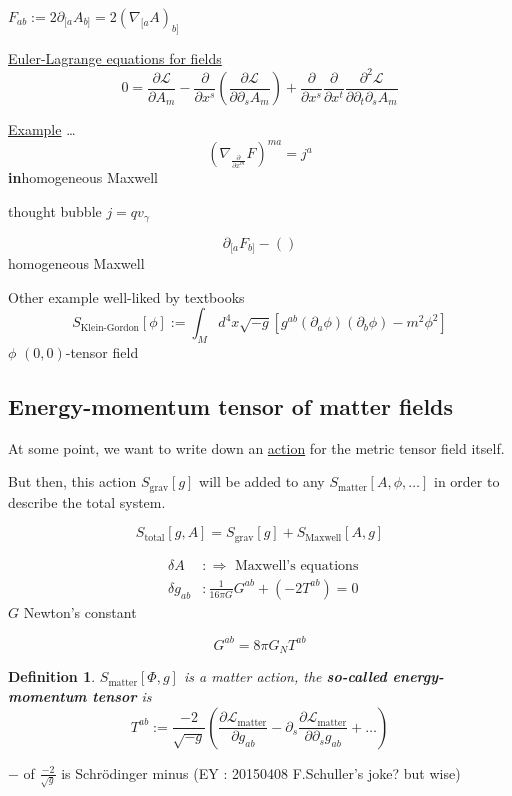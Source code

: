 \documentclass[10pt]{amsart}
\newtheorem{definition}{Definition}
\begin{document}
\begin{multicols*}{2}
	$F_{ab} := 2\partial_{[a}A_{b]} = 2(\nabla_{[a} A)_{b]}$
	
	\underline{Euler-Lagrange equations for fields}
	\[
	0 = \frac{ \partial \mathcal{L}}{ \partial A_m} - \frac{ \partial }{ \partial x^s} \left( \frac{ \partial \mathcal{L}}{ \partial \partial _s A_m } \right) + \frac{ \partial }{ \partial x^s} \frac{ \partial }{ \partial x^t} \frac{ \partial^2 \mathcal{L}}{ \partial \partial_t \partial_s A_m }
	\]
	
	\underline{Example} \dots 
	\[
	(\nabla_{\frac{ \partial }{ \partial x^m} }F)^{ma} = j^a
	\]
	\textbf{in}homogeneous Maxwell
	
	thought bubble $j=qv_{\gamma}$
	
	\[
	\partial_{[a}F_{b]} - ()
	\]
	homogeneous Maxwell
	
	Other example well-liked by textbooks
	\[
	S_{\text{Klein-Gordon}}[\phi] := \int_M d^4x \sqrt{-g}[g^{ab}(\partial_a \phi) (\partial_b \phi ) - m^2\phi^2]
	\]
	$\phi$ $(0,0)$-tensor field
	
	\subsection{Energy-momentum tensor of matter fields}
	
	At some point, we want to write down an \underline{action} for the metric tensor field itself.
	
	But then, this action $S_{\text{grav}}[g]$ will be added to any $S_{\text{matter}}[A,\phi,\dots]$ in order to describe the total system.  
	
	\[
	S_{\text{total}}[g,A] = S_{\text{grav}}[g] + S_{\text{Maxwell}}[A,g]
	\]
	
	\[
	\begin{aligned}
	& \delta A     & : \Longrightarrow \text{ Maxwell's equations } \\
	& \delta g_{ab} & : \boxed{ \frac{1}{ 16 \pi G } G^{ab} } + (-2T^{ab} ) = 0 
	\end{aligned}
	\]
	$G$ Newton's constant
	
	\[
	G^{ab} = 8 \pi G_N T^{ab}
	\]
	
	\begin{definition}
		$  S_{\text{matter}}[\Phi,g] $ is a matter action, the \textbf{so-called energy-momentum tensor} is 
		\[
		T^{ab} := \frac{-2}{ \sqrt{-g}} \left( \frac{ \partial \mathcal{L}_{\text{matter}} }{ \partial g_{ab}} - \partial_s \frac{ \partial \mathcal{L}_{\text{matter}} }{ \partial \partial_s g_{ab}} + \dots \right)
		\]
	\end{definition}
	$-$ of $\frac{-2}{\sqrt{g}}$ is Schr\"{o}dinger minus (EY : 20150408 F.Schuller's joke? but wise)
	

\end{multicols*}
\end{document}
